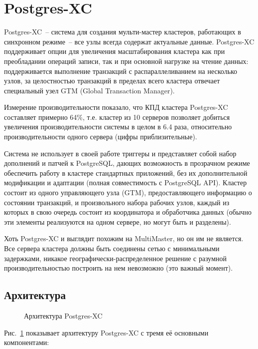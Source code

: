 \section{Postgres-XC}
\label{sec:postgres-xc}

Postgres-XC~-- система для создания мульти-мастер кластеров, работающих в синхронном режиме~-- все узлы всегда содержат актуальные данные. Postgres-XC поддерживает опции для увеличения масштабирования кластера как при преобладании операций записи, так и при основной нагрузке на чтение данных: поддерживается выполнение транзакций с распараллеливанием на несколько узлов, за целостностью транзакций в пределах всего кластера отвечает специальный узел GTM (Global Transaction Manager).

Измерение производительности показало, что КПД кластера Postgres-XC составляет примерно 64\%, т.е. кластер из 10 серверов позволяет добиться увеличения производительности системы в целом в 6.4 раза, относительно производительности одного сервера (цифры приблизительные).

Система не использует в своей работе триггеры и представляет собой набор дополнений и патчей к PostgreSQL, дающих возможность в прозрачном режиме обеспечить работу в кластере стандартных приложений, без их дополнительной модификации и адаптации (полная совместимость с PostgreSQL API). Кластер состоит из одного управляющего узла (GTM), предоставляющего информацию о состоянии транзакций, и произвольного набора рабочих узлов, каждый из которых в свою очередь состоит из координатора и обработчика данных (обычно эти элементы реализуются на одном сервере, но могут быть и разделены).

Хоть Postgres-XC и выглядит похожим на MultiMaster, но он им не является. Все сервера кластера должны быть соединены сетью с минимальными задержками, никакое географически-распределенное решение с разумной производительностью построить на нем невозможно (это важный момент).

\subsection{Архитектура}

\begin{figure}[ht!]
  \caption{Архитектура Postgres-XC}
  \label{fig:postgres-xc1}
\end{figure}

Рис.~\ref{fig:postgres-xc1} показывает архитектуру Postgres-XC с тремя её основными компонентами:

